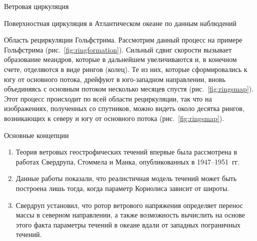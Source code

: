\begin{chapter}{Ветровая циркуляция}
\begin{section}{Поверхностная циркуляция в Атлантическом океане по данным наблюдений}
\begin{paragraph}{Область рециркуляции Гольфстрима.}
Рассмотрим данный процесс на примере Гольфстрима (рис.~\ref{fig:ringformation}). 
Сильный сдвиг скорости вызывает образование меандров, которые в дальнейшем
увеличиваются и, в конечном счете, отделяются в виде рингов (колец). 
Те из них, которые сформировались к югу от основного потока, дрейфуют 
в юго-западном направлении, вновь объединяясь с основным потоком несколько 
месяцев спустя (рис.~\ref{fig:ringsmap}). Этот процесс происходит по всей 
области рециркуляции, так что на изображениях, полученных со спутников, 
можно видеть около десятка рингов, возникающих к северу и югу от основного 
потока (рис.~\ref{fig:ringsmap}).
%
\end{paragraph}
\end{section}

\begin{section}{Основные концепции}
\begin{enumerate}
\item 
Теория ветровых геострофических 
течений впервые была 
рассмотрена в работах Свердрупа, Стоммела и Манка, опубликованных
в 1947--1951~гг.
%

\item 
Данные работы показали, что реалистичная модель течений может быть
построена лишь тогда, когда параметр Кориолиса
зависит от широты.
%

\item 
Свердруп установил, что ротор ветрового напряжения%
 определяет перенос массы в северном 
направлении, а также возможность
вычислить на основе этого факта параметры течений в океане вдали от западных
пограничных течений.
%


\end{enumerate}
\end{section}
\end{chapter}
